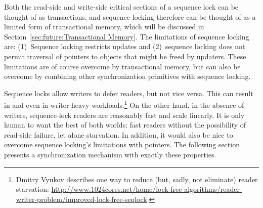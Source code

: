 Both the read-side and write-side critical sections of a sequence lock
can be thought of as transactions, and sequence locking therefore
can be thought of as a limited form of transactional memory, which
will be discussed in Section~\ref{sec:future:Transactional Memory}.
The limitations of sequence locking are: (1)~Sequence locking restricts
updates and (2)~sequence locking does not permit traversal of pointers
to objects that might be freed by updaters.
These limitations are of course overcome by transactional memory, but
can also be overcome by combining other synchronization primitives
with sequence locking.

Sequence locks allow writers to defer readers, but not vice versa.
This can result in  and even 
in writer-heavy workloads.\footnote{
	Dmitry Vyukov describes one way to reduce (but, sadly, not eliminate)
	reader starvation:
	\url{http://www.1024cores.net/home/lock-free-algorithms/reader-writer-problem/improved-lock-free-seqlock}.}
On the other hand, in the absence of writers, sequence-lock readers are
reasonably fast and scale linearly.
It is only human to want the best of both worlds: fast readers without
the possibility of read-side failure, let alone starvation.
In addition, it would also be nice to overcome sequence locking's limitations
with pointers.
The following section presents a synchronization mechanism with exactly
these properties.
